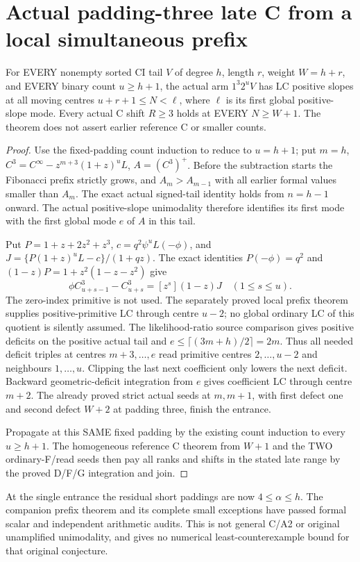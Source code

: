 \section{Actual padding-three late C from a local simultaneous prefix}
For EVERY nonempty sorted CI tail $V$ of degree $h$, length $r$,
weight $W=h+r$, and EVERY binary count $u\ge h+1$, the actual
arm $1^3 2^uV$ has LC positive slopes at all moving centres
$u+r+1\le N<\ell$, where $\ell$ is its first global positive-slope
mode. Every actual C shift $R\ge3$ holds at EVERY $N\ge W+1$.
The theorem does not assert earlier reference C or smaller counts.

\begin{proof}
Use the fixed-padding count induction to reduce to $u=h+1$;
put $m=h$, $C^3=C^\infty-z^{m+3}(1+z)^uL$, $A=(C^3)^+$.
Before the subtraction starts the Fibonacci prefix strictly grows,
and $A_m>A_{m-1}$ with all earlier formal values smaller than $A_m$.
The exact actual signed-tail identity holds from $n=h-1$ onward.
The actual positive-slope unimodality therefore identifies its first
mode with the first global mode $e$ of $A$ in this tail.

Put $P=1+z+2z^2+z^3$, $c=q^2\psi^uL(-\phi)$, and
$J=\{P(1+z)^uL-c\}/(1+qz)$.
The exact identities $P(-\phi)=q^2$ and
$(1-z)P=1+z^2(1-z-z^2)$ give
\[
       \phi C^3_{u+s-1}-C^3_{u+s}=[z^s](1-z)J
                                      \quad(1\le s\le u).
\]
The zero-index primitive is not used. The separately proved local
prefix theorem supplies positive-primitive LC through centre $u-2$;
no global ordinary LC of this quotient is silently assumed.
The likelihood-ratio source comparison gives positive deficits on
the positive actual tail and $e\le\lceil(3m+h)/2\rceil=2m$.
Thus all needed deficit triples at centres $m+3,\ldots,e$ read
primitive centres $2,\ldots,u-2$ and neighbours $1,\ldots,u$.
Clipping the last next coefficient only lowers the next deficit.
Backward geometric-deficit integration from $e$ gives coefficient
LC through centre $m+2$. The already proved strict actual seeds
at $m,m+1$, with first defect one and second defect $W+2$ at
padding three, finish the entrance.

Propagate at this SAME fixed padding by the existing count induction
to every $u\ge h+1$. The homogeneous reference C theorem from $W+1$
and the TWO ordinary-F/read seeds then pay all ranks and shifts
in the stated late range by the proved D/F/G integration and join.
\end{proof}

At the single entrance the residual short paddings are now
$4\le\alpha\le h$. The companion prefix theorem and its complete
small exceptions have passed formal scalar and independent arithmetic
audits. This is not
general C/A2 or original unamplified unimodality, and gives no
numerical least-counterexample bound for that original conjecture.
